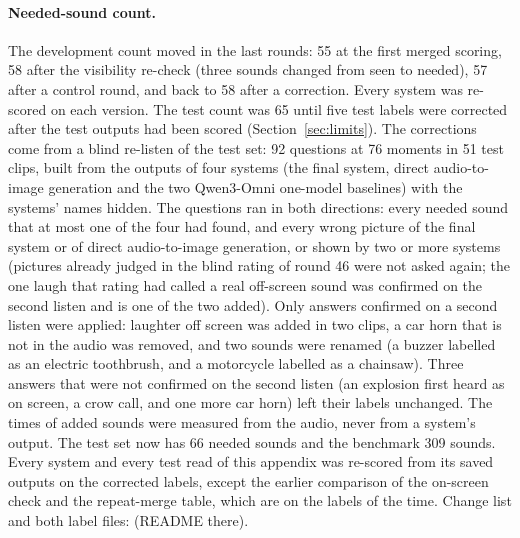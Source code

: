 \paragraph{Needed-sound count.} The development count moved in the last rounds: 55 at the first merged scoring, 58
after the visibility re-check (three sounds changed from seen to needed), 57 after a control round, and back to 58 after
a correction. Every system was re-scored on each version. The test count was 65 until five test labels were corrected
after the test outputs had been scored (Section~\ref{sec:limits}). The corrections come from a blind re-listen of the
test set: 92 questions at 76 moments in 51 test clips, built from the outputs of four systems (the final system, direct
audio-to-image generation and the two Qwen3-Omni one-model baselines) with the systems' names hidden. The questions ran in both
directions: every needed sound that at most one of the four had found, and every wrong picture of the final system or
of direct audio-to-image generation, or shown by two or more systems (pictures already judged in the blind rating of
round 46 were not asked again; the one laugh that rating had called a real off-screen sound was confirmed on the
second listen and is one of the two added). Only answers confirmed on a second listen were applied: laughter off screen was added
in two clips, a car horn that is not in the audio was removed, and two sounds were renamed (a buzzer labelled as an
electric toothbrush, and a motorcycle labelled as a chainsaw). Three answers that were not confirmed on the second
listen (an explosion first heard as on screen, a crow call, and one more car horn) left their labels unchanged. The
times of added sounds were measured from the audio, never from a system's output. The test set now has 66 needed
sounds and the benchmark 309 sounds. Every system and every test read of this appendix was re-scored from its saved
outputs on the corrected labels, except the earlier comparison of the on-screen check and the repeat-merge table, which are on the labels
of the time. Change list and both label files:  (README there).


